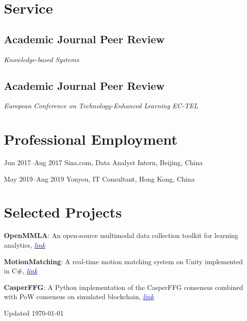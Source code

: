 \documentclass[11pt,letterpaper]{report}
\newcommand{\listitemspace}{0.25em}
\renewenvironment{itemize}
{\begin{list}{}{\setlength{\leftmargin}{0em}
                \setlength{\parskip}{0em}
                \setlength{\itemsep}{\listitemspace}
                \setlength{\parsep}{\listitemspace}}}
{\end{list}}
\begin{document}
    \section*{Service}

    \subsection*{Academic Journal Peer Review}

    \begin{itemize}

        \item \textit{Knowledge-based Systems}

    \end{itemize}

    \subsection*{Academic Journal Peer Review}

    \begin{itemize}

        \item \textit{European Conference on Technology-Enhanced Learning EC-TEL}

    \end{itemize}


    \section*{Professional Employment}

    \begin{tablist}

        \item[Jun 2017--Aug 2017] \tab{}Sina.com, Data Analyst Intern, Beijing, China
        \item[May 2019--Aug 2019] \tab{}Yonyou, IT Consultant, Hong Kong, China
        
    \end{tablist}

    \section*{Selected Projects}

    \begin{itemize}

        \item \textbf{OpenMMLA}: An open-source multimodal data collection toolkit for learning analytics, \href{https://github.com/ucph-ccs/OpenMMLA}{\textcolor{blue}{\textit{link}}}
        \item \textbf{MotionMatching}: A real-time motion matching system on Unity implemented in C\#, \href{https://github.com/lizaibeim/motion-matching}{\textcolor{blue}{\textit{link}}}
        \item \textbf{CasperFFG}: A Python implementation of the CasperFFG consensus combined with PoW consensus on simulated blockchain, \href{https://github.com/lizaibeim/casper-ffg}{\textcolor{blue}{\textit{link}}}

    \end{itemize}


    \begin{center}
        \vfill
        Updated \monthyeardate\today
    \end{center}
\end{document}
